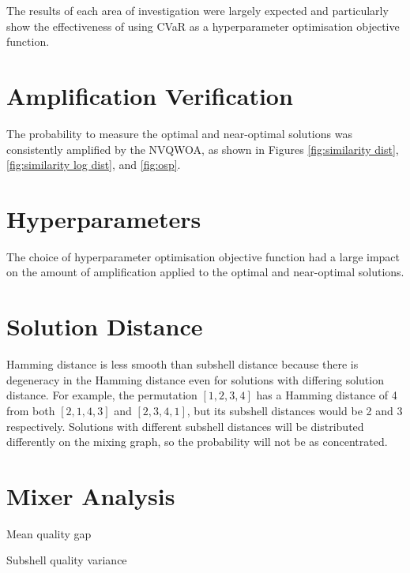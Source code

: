 The results of each area of investigation were largely expected and particularly show the effectiveness of using CVaR as a hyperparameter optimisation objective function.

\section{Amplification Verification}
The probability to measure the optimal and near-optimal solutions was consistently amplified by the NVQWOA, as shown in Figures \ref{fig:similarity dist}, \ref{fig:similarity log dist}, and \ref{fig:osp}.

\section{Hyperparameters}
The choice of hyperparameter optimisation objective function had a large impact on the amount of amplification applied to the optimal and near-optimal solutions. 

\section{Solution Distance}
Hamming distance is less smooth than subshell distance because there is degeneracy in the Hamming distance even for solutions with differing solution distance. For example, the permutation $[1,2,3,4]$ has a Hamming distance of 4 from both $[2,1,4,3]$ and $[2,3,4,1]$, but its subshell distances would be 2 and 3 respectively. Solutions with different subshell distances will be distributed differently on the mixing graph, so the probability will not be as concentrated.

\section{Mixer Analysis}\label{sec:mixer discussion}

Mean quality gap

Subshell quality variance